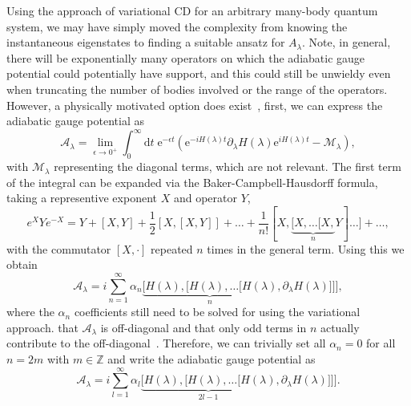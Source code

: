 Using the approach of variational CD for an arbitrary many-body quantum system, we may have simply moved the complexity from knowing the instantaneous eigenstates to finding a suitable ansatz for $A_\lambda$. Note, in general, there will be exponentially many operators on which the adiabatic gauge potential could potentially have support, and this could still be unwieldy even when truncating the number of bodies involved or the range of the operators. However, a physically motivated option does exist~\cite{Claeys2019Floquet}, first, we can express the adiabatic gauge potential as 
\begin{equation}
    \mathcal{A}_\lambda = \lim_{\epsilon\rightarrow 0^+} \int_0^\infty \mathrm{d}t \; \mathrm{e}^{-\epsilon t} (\mathrm{e}^{-i H(\lambda)t} \partial_\lambda H(\lambda) \mathrm{e}^{i H(\lambda)t} - \mathcal{M}_\lambda ),
\end{equation}
with $\mathcal{M}_\lambda$ representing the diagonal terms, which are not relevant. The first term of the integral can be expanded via the Baker-Campbell-Hausdorff formula, taking a representive exponent $X$ and operator $Y$,
\begin{equation}
    e^X Y e^{-X} = Y + [X,Y] + \frac{1}{2} [X,[X,Y]] + \dots + \frac{1}{n!} [X, \underbrace{[ X, \dots [X,}_{n} Y]\dots] + \dots ,
\end{equation}
with the commutator $[X,\cdot]$ repeated $n$ times in the general term. Using this we obtain 
\begin{equation}
    \mathcal{A}_\lambda = i\sum_{n=1}^\infty \alpha_n \underbrace{\Big[H(\lambda),\big[H(\lambda),\ldots[H(\lambda)}_{n},\partial_\lambda H(\lambda)]\big]\Big], 
\end{equation}
where the $\alpha_n$ coefficients still need to be solved for using the variational approach.  that $\mathcal{A}_\lambda$ is off-diagonal and that only odd terms in $n$ actually contribute to the off-diagonal~\cite{Claeys2019Floquet}. Therefore, we can trivially set all $\alpha_n=0$ for all $n = 2m$ with $m \in \mathbb{Z}$ and write the adiabatic gauge potential as
\begin{equation}\label{eq:commansatz}
    \mathcal{A}_\lambda = i\sum_{l=1}^\infty \alpha_l \underbrace{\Big[H(\lambda),\big[H(\lambda),\ldots[H(\lambda)}_{2l-1},\partial_\lambda H(\lambda)]\big]\Big].
\end{equation}
